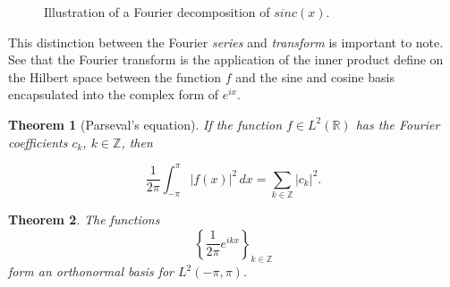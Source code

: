 \documentclass{article}
\newtheorem{thm}{Theorem}[section]
\begin{document}
\begin{figure}[H]
\centering
\caption{Illustration of a Fourier decomposition of $sinc(x)$.}
\end{figure}

This distinction between the Fourier \emph{series} and \emph{transform} is
important to note.  See that the Fourier transform is the application of the
inner product define on the Hilbert space between the function $f$ and the sine
and cosine basis encapsulated into the complex form of $e^{ix}$.

\begin{thm}[Parseval's equation]
  If the function $f \in L^2(\mathbb{R})$ has the Fourier coefficients $c_k$,
  $k \in \mathbb{Z}$, then

  \[
    \frac{1}{2\pi} \int_{-\pi}^{\pi} | f(x) |^2 \, dx
    = \sum_{k \in \mathbb{Z}} | c_k |^2.
  \]
\end{thm}

\begin{thm}
  The functions
  \[
    \left\{ \frac{1}{2\pi} e^{ikx} \right\}_{k \in \mathbb{Z}}
  \]
  form an orthonormal basis for $L^2(-\pi,\pi)$.
\end{thm}
\end{document}
